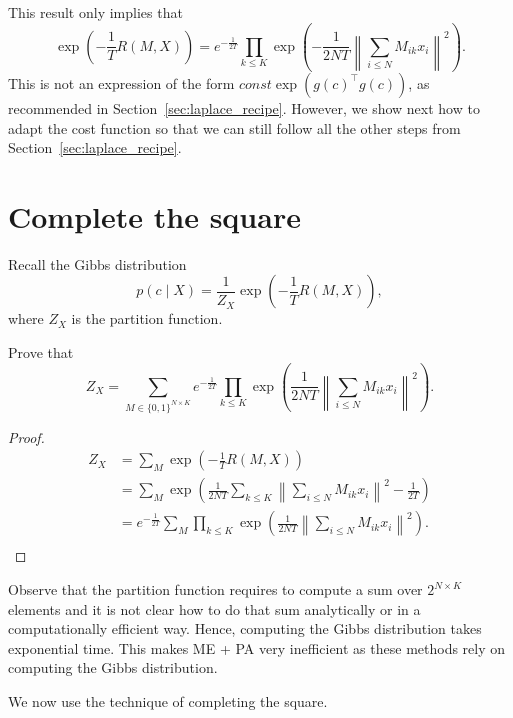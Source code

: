This result only implies that
%
\begin{equation}
\exp\left(-\frac{1}{T}R(M, X)\right) = e^{-\frac{1}{2T}}\prod_{k \leq K}\exp\left(-\frac{1}{2NT}\left\|\sum_{i \leq N}M_{ik}x_i\right\|^2\right).
\end{equation}
%
This is not an expression of the form $\textit{const} \exp\left(g(c)^\top g(c)\right)$, as recommended in Section~\ref{sec:laplace_recipe}. However, we show next how to adapt the cost function so that we can still follow all the other steps from Section~\ref{sec:laplace_recipe}.

\section{Complete the square}

Recall the Gibbs distribution
%
$$p(c \mid X) = \frac{1}{Z_X}\exp\left(-\frac{1}{T}R(M, X)\right),$$
%
where $Z_X$ is the partition function. 

\begin{exercise}
Prove that
%
\begin{equation}
Z_X = \sum_{M \in \{0, 1\}^{N \times K}}e^{-\frac{1}{2T}}\prod_{k \leq K} \exp\left(\frac{1}{2NT}\left\|\sum_{i \leq N} M_{ik}x_i\right\|^2\right).
\label{eq:partition_function}
\end{equation}
%
\end{exercise}

\begin{proof}
\begin{align*}
Z_X &= \sum_{M} \exp\left(-\frac{1}{T}R(M, X)\right)\\
&= \sum_{M} \exp\left(\frac{1}{2NT}\sum_{k \leq K}\left\|\sum_{i \leq N} M_{ik}x_i\right\|^2 - \frac{1}{2T}\right)\\
&= e^{-\frac{1}{2T}}\sum_{M} \prod_{k \leq K}\exp\left(\frac{1}{2NT}\left\|\sum_{i \leq N} M_{ik}x_i\right\|^2\right).\\
\end{align*}
\end{proof}

Observe that the partition function requires to compute a sum over $2^{N \times K}$ elements and it is not clear how to do that sum analytically or in a computationally efficient way. Hence, computing the Gibbs distribution takes exponential time. This makes ME + PA very inefficient as these methods rely on computing the Gibbs distribution.

We now use the technique of completing the square.

